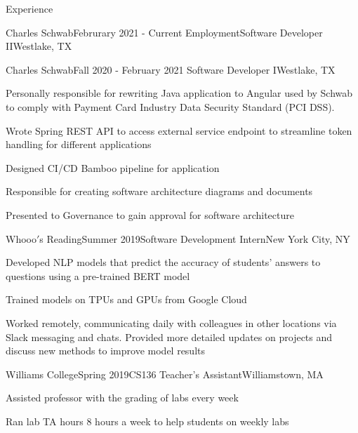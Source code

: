 \documentclass{resume} %
\begin{document}

\begin{rSection}{Experience}
\begin{rSubsection}{Charles Schwab}{Februrary 2021 - Current Employment}{Software Developer II}{Westlake, TX}
\end{rSubsection}
\begin{rSubsection}{Charles Schwab}{Fall 2020 - February 2021 }{Software Developer I}{Westlake, TX}
\item Personally responsible for rewriting Java application to Angular used by Schwab to comply with Payment Card Industry Data Security Standard (PCI DSS).
\item Wrote Spring REST API to access external service endpoint to streamline token handling for different applications
\item Designed CI/CD Bamboo pipeline for application
\item Responsible for creating software architecture diagrams and documents \item Presented to Governance to gain approval for software architecture
\end{rSubsection}


\begin{rSubsection}{Whooo$'$s Reading}{Summer 2019}{Software Development Intern}{New York City, NY}
\item Developed NLP models that predict the accuracy of students’ answers to questions using a pre-trained BERT model
\item Trained models on TPUs and GPUs from Google Cloud
\item Worked remotely, communicating daily with colleagues in other locations via Slack messaging and chats. Provided more detailed updates on projects and discuss new methods to improve model results
\end{rSubsection}


\begin{rSubsection}{Williams College}{Spring 2019}{CS136 Teacher's Assistant}{Williamstown, MA}
\item Assisted professor with the grading of labs every week
\item Ran lab TA hours 8 hours a week to help students on weekly labs
\end{rSubsection}

\end{rSection}
\end{document}
